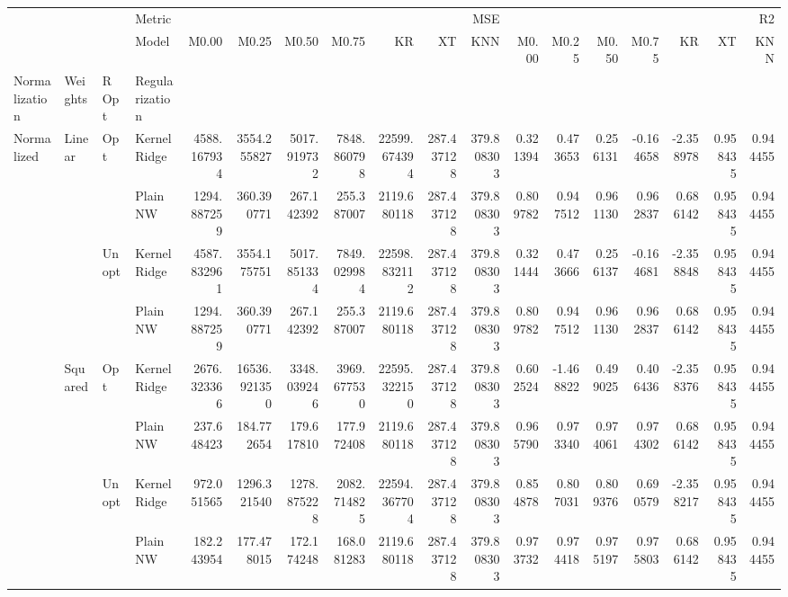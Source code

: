 \begin{tabular}{llllrrrrrrrrrrrrrr}
\toprule
 &  &  & Metric & \multicolumn{7}{r}{MSE} & \multicolumn{7}{r}{R2} \\
 &  &  & Model & M0.00 & M0.25 & M0.50 & M0.75 & KR & XT & KNN & M0.00 & M0.25 & M0.50 & M0.75 & KR & XT & KNN \\
Normalization & Weights & R Opt & Regularization &  &  &  &  &  &  &  &  &  &  &  &  &  &  \\
\midrule
\multirow[t]{8}{*}{Normalized} & \multirow[t]{4}{*}{Linear} & \multirow[t]{2}{*}{Opt} & KernelRidge & 4588.167934 & 3554.255827 & 5017.919732 & 7848.860798 & 22599.674394 & 287.437128 & 379.808303 & 0.321394 & 0.473653 & 0.256131 & -0.164658 & -2.358978 & 0.958435 & 0.944455 \\
 &  &  & Plain NW & 1294.887259 & 360.390771 & 267.142392 & 255.387007 & 2119.680118 & 287.437128 & 379.808303 & 0.809782 & 0.947512 & 0.961130 & 0.962837 & 0.686142 & 0.958435 & 0.944455 \\
\cline{3-18}
 &  & \multirow[t]{2}{*}{Unopt} & KernelRidge & 4587.832961 & 3554.175751 & 5017.851334 & 7849.029984 & 22598.832112 & 287.437128 & 379.808303 & 0.321444 & 0.473666 & 0.256137 & -0.164681 & -2.358848 & 0.958435 & 0.944455 \\
 &  &  & Plain NW & 1294.887259 & 360.390771 & 267.142392 & 255.387007 & 2119.680118 & 287.437128 & 379.808303 & 0.809782 & 0.947512 & 0.961130 & 0.962837 & 0.686142 & 0.958435 & 0.944455 \\
\cline{2-18} \cline{3-18}
 & \multirow[t]{4}{*}{Squared} & \multirow[t]{2}{*}{Opt} & KernelRidge & 2676.323366 & 16536.921350 & 3348.039246 & 3969.677530 & 22595.322150 & 287.437128 & 379.808303 & 0.602524 & -1.468822 & 0.499025 & 0.406436 & -2.358376 & 0.958435 & 0.944455 \\
 &  &  & Plain NW & 237.648423 & 184.772654 & 179.617810 & 177.972408 & 2119.680118 & 287.437128 & 379.808303 & 0.965790 & 0.973340 & 0.974061 & 0.974302 & 0.686142 & 0.958435 & 0.944455 \\
\cline{3-18}
 &  & \multirow[t]{2}{*}{Unopt} & KernelRidge & 972.051565 & 1296.321540 & 1278.875228 & 2082.714825 & 22594.367704 & 287.437128 & 379.808303 & 0.854878 & 0.807031 & 0.809376 & 0.690579 & -2.358217 & 0.958435 & 0.944455 \\
 &  &  & Plain NW & 182.243954 & 177.478015 & 172.174248 & 168.081283 & 2119.680118 & 287.437128 & 379.808303 & 0.973732 & 0.974418 & 0.975197 & 0.975803 & 0.686142 & 0.958435 & 0.944455 \\
\cline{1-18} \cline{2-18} \cline{3-18}
\bottomrule
\end{tabular}
